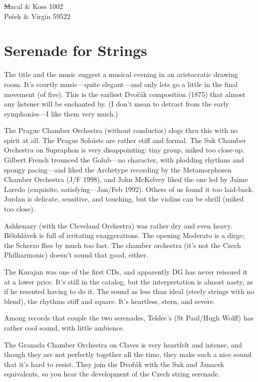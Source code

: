 \documentclass[12pt]{article}%
\begin{document}
\st
Macal & Koss 1002\\
Pešek & Virgin 59522
\et

\section{Serenade for Strings}

The title and the music suggest a musical evening in an aristocratic drawing room. It's courtly music---quite elegant---and only lets go a little in the final movement (of five). This is the earliest  Dvořák composition (1875) that almost any listener will be enchanted by. (I don't mean to detract from the early symphonies---I like them very much.)

The Prague Chamber Orchestra (without conductor) slogs thru this with no spirit at all.
The Prague Soloists are rather stiff and formal.
The Suk Chamber Orchestra on Supraphon is very disappointing: tiny group, miked too close-up. Gilbert French trounced the Golub---no character, with plodding rhythms and spongy pacing---and liked the Archetype recording by the Metamorphosen Chamber Orchestra (J/F 1998), and John McKelvey liked the one led by Jaime Laredo (exquisite, satisfying---Jan/Feb 1992). Others of us found it too laid-back. Jordan is delicate, sensitive, and touching, but the violins can be shrill (miked too close).

Ashkenazy (with the Cleveland Orchestra) was rather dry and even heavy. Bělohlávek is full of irritating exaggerations. The opening Moderato is a dirge; the Scherzo flies by much too fast. The chamber orchestra (it's not the Czech Philharmonic) doesn't sound that good, either.

The Karajan was one of the first CDs, and apparently DG has never reissued it at a lower price. It's still in the catalog, but the interpretation is almost nasty, as if he resented having to do it. The sound as less than ideal (steely strings with no blend), the rhythms stiff and square. It's heartless, stern, and severe.

Among records that couple the two serenades, Teldec's (St Paul/Hugh Wolff) has rather cool sound, with little ambience.

The Granada Chamber Orchestra on Claves is very heartfelt and intense, and though they are not perfectly together all the time, they make such a nice sound that it's hard to resist. They join the  Dvořák with the Suk and Janacek equivalents, so you hear the development of the Czech string serenade.
\end{document}
